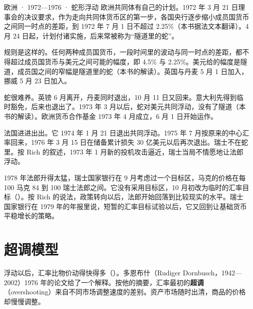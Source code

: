 \begin{case}{欧洲 · 1972—1976 · 蛇形浮动}
欧洲共同体有自己的计划。1972 年 3 月 21 日理事会的决议要求，作为走向共同体货币区的第一步，各国央行逐步缩小成员国货币之间同一时点的差距，到 1972 年 7 月 1 日不超过 2.25\%（本书据法文本翻译）\cite{ojc1972}。4 月 24 日起，计划付诸实施，后来常被称为“隧道里的蛇”\cite{bis1973}。

规则是这样的。任何两种成员国货币，一段时间里的波动与同一时点的差距，都不得超过成员国货币与美元之间可能的幅度，即 4.5\% 与 2.25\%\cite{bis1973}。美元给的幅度是隧道，成员国之间的窄幅是隧道里的蛇（本书的解读）。英国与丹麦 5 月 1 日加入，挪威 5 月 23 日加入\cite{bis1973}。

蛇很难养。英镑 6 月离开，丹麦同时退出，10 月 11 日又回来\cite{bis1973}。意大利先得到临时豁免，后来也退出了\cite{bis1973}。1973 年 3 月以后，蛇对美元共同浮动，没有了隧道（本书的解读）。欧洲货币合作基金 1973 年 4 月成立，6 月 1 日开始运作\cite{bis1973}。

法国进进出出。它 1974 年 1 月 21 日退出共同浮动\cite{bis1974}。1975 年 7 月按原来的中心汇率回来，1976 年 3 月 15 日在储备累计损失 30 亿美元以后再次退出\cite{bis1976}。瑞士不在蛇里。按 Rich 的叙述，1973 年 1 月新的投机攻击逼近，瑞士当局不情愿地让法郎浮动\cite{rich2003}。

1978 年法郎升得太猛，瑞士国家银行在 9 月考虑过一个目标区，马克的价格在每 100 马克 84 到 100 瑞士法郎之间\cite{rich2003}。它没有采用目标区，10 月初改为临时的汇率目标（）\cite{rich2003}。按 Rich 的说法，政策转向以后，法郎开始回落到比较现实的水平\cite{rich2003}。瑞士国家银行在 1979 年的年报里说，短暂的汇率目标试验以后，它又回到让基础货币平稳增长的策略\cite{rich2003}。
\end{case}

\section{超调模型}\label{sec:floating-model}

浮动以后，汇率比物价动得快得多（）。多恩布什（Rudiger Dornbusch，1942—2002）1976 年的论文给了一个解释\cite{dornbusch1976,loc46}。按他的摘要，汇率最初的\textbf{超调}（overshooting）来自不同市场调整速度的差别\cite{dornbusch1976}。资产市场随时出清，商品的价格却慢慢调整。

